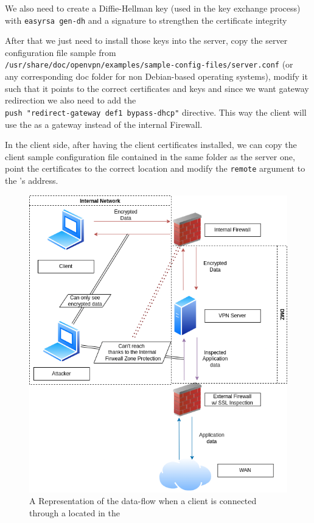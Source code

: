 We also need to create a Diffie-Hellman\cite{diffie-hellman} key (used in the key exchange process) with \verb|easyrsa gen-dh| and a \cite{hmac} signature to strengthen the  certificate integrity\cite{https://www.vultr.com/docs/how-to-create-an-openvpn-server-on-ubuntu-20-04/}

After that we just need to install those keys into the server, copy the server configuration file sample from \\
\verb|/usr/share/doc/openvpn/examples/sample-config-files/server.conf| (or\\ any corresponding doc folder for non Debian-based operating systems), modify it such that it points to the correct certificates and keys and since we want gateway redirection we also need to add the \\ \verb|push "redirect-gateway def1 bypass-dhcp"| directive. This way the client will use the  as a gateway instead of the internal Firewall.

In the client side, after having the client certificates installed, we can copy the client sample configuration file contained in the same folder as the server one, point the certificates to the correct location and modify the \verb|remote| argument to the 's  address.

\newpage


\begin{figure}[h!]
 \centering
 \includegraphics[width=13.5cm]{img/VPN_inner_working.png}
 \caption{A Representation of the data-flow when a client is connected through a  located in the }
 \label{fig: Inner Workings}
\end{figure}


